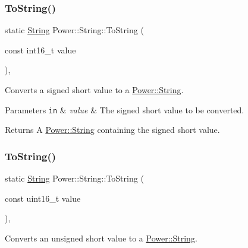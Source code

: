 \subsubsection{\texorpdfstring{To\+String()}{ToString()}\hspace{0.1cm}{\footnotesize\ttfamily [4/11]}}
{\footnotesize\ttfamily static \hyperlink{class_power_1_1_string}{String} Power\+::\+String\+::\+To\+String (\begin{DoxyParamCaption}\item[{const int16\+\_\+t}]{value }\end{DoxyParamCaption})\hspace{0.3cm}{\ttfamily [inline]}, {\ttfamily [static]}}



Converts a signed short value to a \hyperlink{class_power_1_1_string}{Power\+::\+String}. 


\begin{DoxyParams}[1]{Parameters}
\mbox{\tt in}  & {\em value} & The signed short value to be converted. \\
\hline
\end{DoxyParams}
\begin{DoxyReturn}{Returns}
A \hyperlink{class_power_1_1_string}{Power\+::\+String} containing the signed short value. 
\end{DoxyReturn}
\mbox{\label{class_power_1_1_string_a772fcd39002ebfc3bae0a96691bb5d57}} 
\subsubsection{\texorpdfstring{To\+String()}{ToString()}\hspace{0.1cm}{\footnotesize\ttfamily [5/11]}}
{\footnotesize\ttfamily static \hyperlink{class_power_1_1_string}{String} Power\+::\+String\+::\+To\+String (\begin{DoxyParamCaption}\item[{const uint16\+\_\+t}]{value }\end{DoxyParamCaption})\hspace{0.3cm}{\ttfamily [inline]}, {\ttfamily [static]}}



Converts an unsigned short value to a \hyperlink{class_power_1_1_string}{Power\+::\+String}. 


